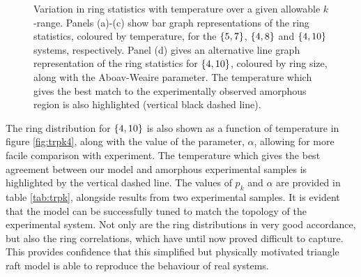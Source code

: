 \begin{figure}[bt]
     \caption{Variation in ring statistics with temperature over a given allowable $k$\--range. Panels (a)-(c) show bar graph representations of the ring statistics, coloured by temperature, for the $\left\{5,7\right\}$, $\left\{4,8\right\}$ and $\left\{4,10\right\}$ systems, respectively. Panel (d) gives an alternative line graph representation of the ring statistics for $\left\{4,10\right\}$, coloured by ring size, along with the Aboav\--Weaire parameter. The temperature which gives the best match to the experimentally observed amorphous region is also highlighted (vertical black dashed line).}
     \label{fig:trpk}
\end{figure}

The ring distribution for $\left\{4,10\right\}$ is also shown as a function of temperature in figure \ref{fig:trpk4}, along with the value of the \aw{} parameter, $\alpha$, allowing for more facile comparison with experiment. 
The temperature which gives the best agreement between our model and amorphous experimental samples is highlighted by the vertical dashed line. 
The values of $p_k$ and $\alpha$ are provided in table \ref{tab:trpk}, alongside results from two experimental samples. 
It is evident that the model can be successfully tuned to match the topology of the experimental system. 
Not only are the ring distributions in very good accordance, but also the ring correlations, which have until now proved difficult to capture. 
This provides confidence that this simplified but physically motivated triangle raft model is able to reproduce the behaviour of real systems.

